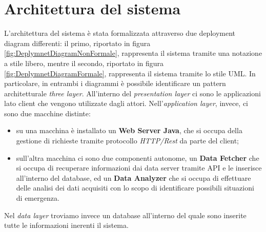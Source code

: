 \clearpage
\section{Architettura del sistema}
L'architettura del sistema è stata formalizzata attraverso due deployment diagram differenti: il primo, riportato in figura \ref{fig:DeplymnetDiagramNonFormale}, rappresenta il sistema tramite una notazione a stile libero, mentre il secondo, riportato in figura \ref{fig:DeplymnetDiagramFormale}, rappresenta il sistema tramite lo stile UML. In particolare, in entrambi i diagrammi è possibile identificare un pattern architetturale \textit{three layer}. All'interno del \textit{presentation layer} ci sono le applicazioni lato client che vengono utilizzate dagli attori. Nell'\textit{application layer}, invece, ci sono due macchine distinte:

\begin{itemize}
	\item su una macchina è installato un \textbf{Web Server Java}, che si occupa della gestione di richieste tramite protocollo \textit{HTTP/Rest} da parte del client;
	\item sull'altra macchina ci sono due componenti autonome, un \textbf{Data Fetcher} che si occupa di recuperare informazioni dai data server tramite API e le inserisce all'interno del database, ed un \textbf{Data Analyzer} che si occupa di effettuare delle analisi dei dati acquisiti con lo scopo di identificare possibili situazioni di emergenza.
\end{itemize}

Nel \textit{data layer} troviamo invece un database all'interno del quale sono inserite tutte le informazioni inerenti il sistema.


